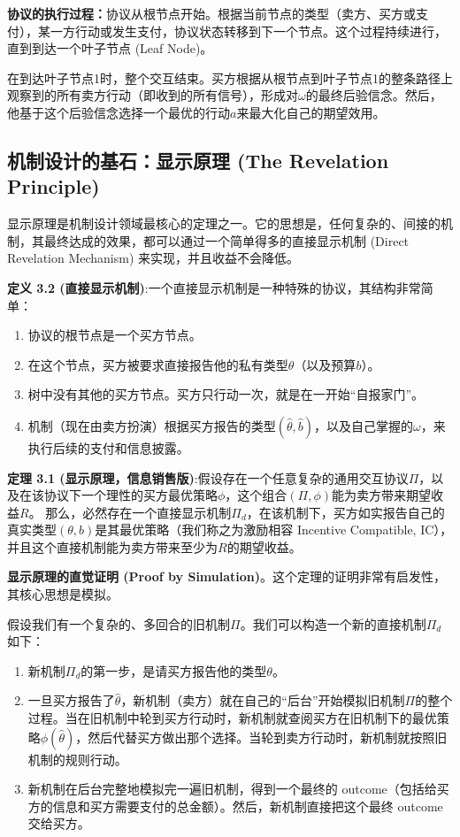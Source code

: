 \textbf{协议的执行过程：}协议从根节点开始。根据当前节点的类型（卖方、买方或支付），某一方行动或发生支付，协议状态转移到下一个节点。这个过程持续进行，直到到达一个叶子节点 (Leaf Node)。

在到达叶子节点1时，整个交互结束。买方根据从根节点到叶子节点1的整条路径上观察到的所有卖方行动（即收到的所有信号），形成对$\omega$的最终后验信念。然后，他基于这个后验信念选择一个最优的行动$a$来最大化自己的期望效用。

\subsection{机制设计的基石：显示原理 (The Revelation Principle)}

显示原理是机制设计领域最核心的定理之一。它的思想是，任何复杂的、间接的机制，其最终达成的效果，都可以通过一个简单得多的直接显示机制 (Direct Revelation Mechanism) 来实现，并且收益不会降低。

\textbf{定义 3.2 (直接显示机制)}:一个直接显示机制是一种特殊的协议，其结构非常简单：
\begin{enumerate}
    \item 协议的根节点是一个买方节点。
    \item 在这个节点，买方被要求直接报告他的私有类型$\theta$（以及预算$b$）。
    \item 树中没有其他的买方节点。买方只行动一次，就是在一开始“自报家门”。
    \item 机制（现在由卖方扮演）根据买方报告的类型$(\hat{\theta},\hat{b})$，以及自己掌握的$\omega$，来执行后续的支付和信息披露。
\end{enumerate}

\textbf{定理 3.1 (显示原理，信息销售版)}:假设存在一个任意复杂的通用交互协议$\Pi$，以及在该协议下一个理性的买方最优策略$\phi$，这个组合$(\Pi,\phi)$能为卖方带来期望收益$R$。
那么，必然存在一个直接显示机制$\Pi_d$，在该机制下，买方如实报告自己的真实类型$(\theta,b)$是其最优策略（我们称之为激励相容 Incentive Compatible, IC），并且这个直接机制能为卖方带来至少为$R$的期望收益。

\textbf{显示原理的直觉证明 (Proof by Simulation)}。这个定理的证明非常有启发性，其核心思想是模拟。

假设我们有一个复杂的、多回合的旧机制$\Pi$。我们可以构造一个新的直接机制$\Pi_d$如下：

\begin{enumerate}
    \item 新机制$\Pi_d$的第一步，是请买方报告他的类型$\theta$。
    \item 一旦买方报告了$\hat{\theta}$，新机制（卖方）就在自己的“后台”开始模拟旧机制$\Pi$的整个过程。当在旧机制中轮到买方行动时，新机制就查阅买方在旧机制下的最优策略$\phi(\hat{\theta})$，然后代替买方做出那个选择。当轮到卖方行动时，新机制就按照旧机制的规则行动。
    \item 新机制在后台完整地模拟完一遍旧机制，得到一个最终的 outcome（包括给买方的信息和买方需要支付的总金额）。然后，新机制直接把这个最终 outcome 交给买方。
\end{enumerate}

